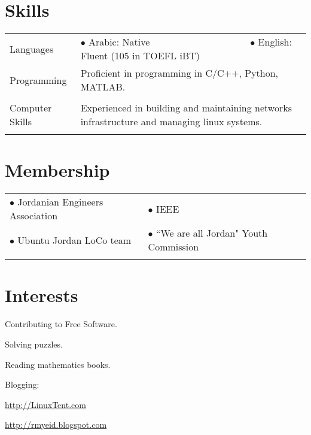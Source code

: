 \documentclass[a4paper, oneside, final]{scrartcl}
\newcommand{\twidthb}{12.65cm}
\newcommand{\twidtha}{3.0cm}
\begin{document}
\begin{tabular}{p{\twidtha}p{\twidthb}}
\end{tabular}
\section{Skills}

\begin{tabular}{p{\twidtha} p{\twidthb}}
Languages & 

$\bullet$ Arabic: Native \,\,\,\,\,\,\,\,\,\,\,\,\,\,\,\,\,\,\,\,\,\,\,\,\,\,\,\,\,\,\,\,\,\,\,\,\,\,\,\,\,\,\,\,\,\,\,\,\,\,\,\,\,\,\,\,\,\,\,
$\bullet$ English: Fluent \footnotesize{(105 in TOEFL iBT)}


\\
Programming & Proficient in programming in C/C++, Python, MATLAB.
\\
\\
Computer Skills & Experienced in building and maintaining networks infrastructure and managing linux systems.
\\ &


\end{tabular}

\section{Membership}
\begin{tabular}{p{}p{}}
    $\bullet$ Jordanian Engineers Association &
    $\bullet$ IEEE \\ \vspace{0.05pt}
    $\bullet$ Ubuntu Jordan LoCo team & \vspace{0.05pt}
    $\bullet$ ``We are all Jordan" Youth Commission \\ &
\end{tabular}

\section{Interests}
\vspace{-14pt}
\begin{multicols}{2}
        \begin{compactitem}
\item Contributing to Free Software.
\item Solving puzzles.
\item Reading mathematics books.
\item Blogging:
       \begin{compactitem}
    \item \url{http://LinuxTent.com}
    \item \url{http://rmyeid.blogspot.com}
            \end{compactitem} 
            \end{compactitem} 
\end{multicols}


      
\end{document}
